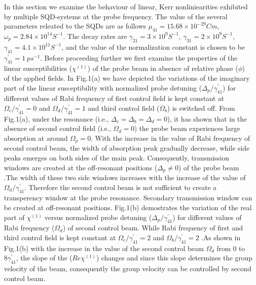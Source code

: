 \documentclass[12pt,a4paper]{article}
\begin{document}
In this section we examine the behaviour of linear, Kerr nonliniearities exhibited by multiple SQD-systems at the probe frequency. The value of the several parameters releated to the SQDs are as follows \(\mu_{41} = 15.68\times10^{-29} Cm\), \(\omega_p = 2.84\times10^{14} S^{-1}\). The decay rates are \(\gamma_{21}=3\times10^9S^{-1}\), \( \gamma_{31}=2\times10^9S^{-1} \), \( \gamma_{41}=4.1\times10^{11}S^{-1} \), and the value of the normalization constant is chosen to be \( \gamma^{\prime}_{41}=1\ ps^{-1} \). Before proceeding further we first examine the properties of the linear susceptibilities (\(\chi^{(1)}\)) of the probe beam in absence of relative phase ($\phi$) of the applied fields. In Fig.1(a) we have depicted the variations of the imaginary part of the linear susceptibility with normalized probe detuning ($\Delta_p/\gamma^{\prime}_{41}$) for different values of Rabi frequency of first control field is kept constant at $\Omega_c/\gamma^{\prime}_{41}=0$ and $\Omega_d/\gamma^{\prime}_{41}=1$ and third control field ($\Omega_b$) is switched off. From Fig.1(a), under the resonance (i.e., $\Delta_c = \Delta_b = \Delta_d = 0$), it has shown that in the absence of second control field (i.e., $\Omega_d = 0$) the probe beam experiences large absorption at around $\Omega_p=0$. With the increase in the value of Rabi frequency of second control beam, the width of absorption peak gradually decrease, while side peaks emerges on both sides of the main peak. Consequently, transmission windows are created at the off-resonant positions ($\Delta_p \neq 0$) of the probe beam .The width of these two side windows increases with the increase of the value of $\Omega_d/\gamma^{\prime}_{41}$. Therefore the second control beam is not sufficient to create a transperency window at the probe resonance. Secondary transmission window can be created at off-resonant positions. Fig.1(b) demostrates the variation of the real part of $\chi^{(1)}$ versus normalized probe detuning ($\Delta_p/\gamma^{\prime}_{41}$) for different values of Rabi frequency ($\Omega_{d}$) of second control beam. While Rabi frequency of first and third control field is kept constant at $\Omega_{c}/\gamma^{\prime}_{41}=2$ and $\Omega_{b}/\gamma^{\prime}_{41}=2$ .As shown in Fig.1(b) with the increase in the value of the second control beam $\Omega_{d}$ from $0$ to $8\gamma^{\prime}_{41}$, the slope of the ($Re\chi^{(1)}$) changes and since this slope determines the group velocity of the beam, consequently the group velocity can be controlled by second control beam. \par
\end{document}
